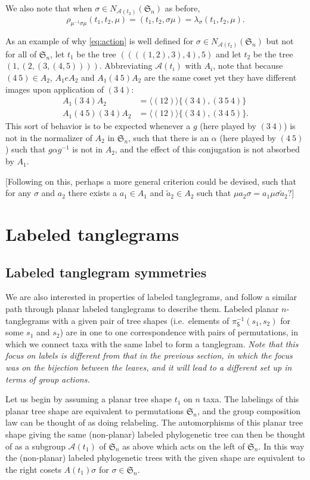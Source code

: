 \documentclass{amsart}
\newcommand{\fS}{\mathfrak S}
\newcommand{\aut}{\mathcal A}
\newcommand{\pairing}{\mu}
\newcommand{\shape}{\mathsf{S}}
\begin{document}
We also note that when $\sigma \in N_{\aut(t_2)}(\fS_n)$ as before,
\[
\rho_{\pairing^{-1} \sigma \pairing} (t_1, t_2, \pairing) =
(t_1, t_2, \sigma \pairing) =
\lambda_{\sigma} (t_1, t_2, \pairing).
\]

As an example of why \eqref{eq:action} is well defined for $\sigma \in N_{\aut(t_2)}(\fS_n)$ but not for all of $\fS_n$, let $t_1$ be the tree $((((1,2),3),4),5)$ and let $t_2$ be the tree $(1,(2,(3,(4,5))))$.
Abbreviating $\aut(t_i)$ with $A_i$, note that because $(4\ 5) \in A_2$, $A_1 e A_2$ and $A_1 (4\ 5) A_2$ are the same coset yet they have different images upon application of $(3\ 4)$:
\begin{align*}
A_1 (3\ 4) A_2 & = \langle (1 2) \rangle \{(3\ 4), (3\ 5\ 4)\} \\
A_1 (4\ 5) (3\ 4) A_2 & = \langle (1 2) \rangle \{(3\ 4), (3\ 4\ 5)\}.
\end{align*}
This sort of behavior is to be expected whenever a $g$ (here played by $(3\ 4)$) is not in the normalizer of $A_2$ in $\fS_n$, such that there is an $\alpha$ (here played by $(4\ 5)$) such that $g \alpha g^{-1}$ is not in $A_2$, and the effect of this conjugation is not absorbed by $A_1$.

[Following on this, perhaps a more general criterion could be devised, such that for any $\sigma$ and $a_2$ there exists a $a_1 \in A_1$ and $\tilde a_2 \in A_2$ such that $\pairing a_2 \sigma = a_1 \pairing \sigma \tilde a_2$?]


\section{Labeled tanglegrams}
\subsection{Labeled tanglegram symmetries}
We are also interested in properties of labeled tanglegrams, and follow a similar path through planar labeled tanglegrams to describe them.
Labeled planar $n$-tanglegrams with a given pair of tree shapes (i.e.\ elements of $\pi_\shape^{-1}(s_1, s_2)$ for some $s_1$ and $s_2$) are in one to one correspondence with pairs of permutations, in which we connect taxa with the same label to form a tanglegram.
\emph{Note that this focus on labels is different from that in the previous section, in which the focus was on the bijection between the leaves, and it will lead to a different set up in terms of group actions.}

Let us begin by assuming a planar tree shape $t_1$ on $n$ taxa.
The labelings of this planar tree shape are equivalent to permutations $\fS_n$, and the group composition law can be thought of as doing relabeling.
The automorphisms of this planar tree shape giving the same (non-planar) labeled phylogenetic tree can then be thought of as a subgroup $\aut(t_1)$ of $\fS_n$ as above which acts on the left of $\fS_n$.
In this way the (non-planar) labeled phylogenetic trees with the given shape are equivalent to the right cosets $A(t_1) \sigma$ for $\sigma \in \fS_n$.
\end{document}
